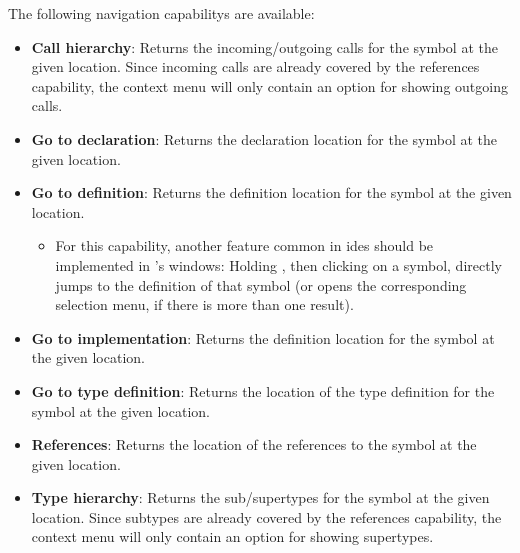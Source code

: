 \documentclass[../thesis]{subfiles}
\begin{document}
The following navigation \glspl{capability} are available:
\begin{itemize}
	\item \textbf{Call hierarchy}: Returns the incoming/outgoing calls for the symbol at the given location.
	      Since incoming calls are already covered by the references \gls{capability}, the context menu will only contain an option for showing outgoing calls.
	\item \textbf{Go to declaration}: Returns the declaration location for the symbol at the given location.
	\item \textbf{Go to definition}: Returns the definition location for the symbol at the given location.
	      \begin{itemize}
		      \item For this \gls{capability}, another feature common in \glspl{ide} should be implemented in \SEE{}'s \glspl{window}:
		            Holding , then clicking on a symbol, directly jumps to the definition of that symbol (or opens the corresponding selection menu, if there is more than one result).
	      \end{itemize}
	\item \textbf{Go to implementation}: Returns the definition location for the symbol at the given location.
	\item \textbf{Go to type definition}: Returns the location of the type definition for the symbol at the given location.
	\item \textbf{References}: Returns the location of the references to the symbol at the given location.
	\item \textbf{Type hierarchy}: Returns the sub/supertypes for the symbol at the given location.
	      Since subtypes are already covered by the references \gls{capability}, the context menu will only contain an option for showing supertypes.
\end{itemize}
\end{document}
